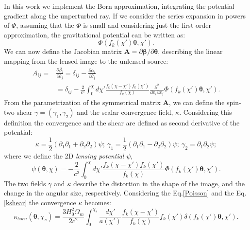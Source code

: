 \documentclass[twocolumn,twocolappendix]{aastex63}
\begin{document}
In this work we implement the Born approximation, integrating the potential gradient along the unperturbed ray. If we consider the series expansion in powers of $\Phi$, assuming that the $\Phi$ is small and considering just the first-order approximation, the gravitational potential  can be written as:
\begin{equation}
    \Phi(f_k(\chi')\boldsymbol{\theta},\chi').
\end{equation}
We can now define the Jacobian matrix \textbf{A}$=\partial\boldsymbol{\beta}/\partial\boldsymbol{\theta}$, describing the linear mapping from the lensed image to the unlensed source:
\begin{align}
    A_{ij}=& \frac{\partial\beta_i}{\partial\theta_j}=
    \delta_{ij}-\frac{\partial\alpha_i}{\partial\theta_j} \\
     & =\delta_{ij}-\frac{2}{c^2}
    \int_0^{\chi} d\chi'
     \frac{f_k(\chi-\chi')f_k(\chi')}{f_k(\chi)}
     \frac{\partial^2}{\partial x_i \partial x_j} \Phi(f_k(\chi')\boldsymbol{\theta},\chi').
\end{align}
From the parametrization of the symmetrical matrix \textbf{A}, we can define the spin-two shear $\gamma=(\gamma_1,\gamma_2)$ and the scalar convergence field, $\kappa$. 
Considering this definition the convergence and the shear are defined as second derivative of the potential:
\begin{equation}\label{kshear}
    \kappa=\frac{1}{2}(\partial_1\partial_1+\partial_2\partial_2)\psi; \ \gamma_1=\frac{1}{2}(\partial_1\partial_1-\partial_2\partial_2)\psi; \ 
    \gamma_2=\partial_1\partial_2\psi;
\end{equation}
where we define the 2D \textit{lensing potential} $\psi$,
\begin{equation}
    \psi(\boldsymbol{\theta},\chi)=
    -\frac{2}{c^2}
    \int_0^{\chi} d\chi'
     \frac{f_k(\chi-\chi')f_k(\chi')}{f_k(\chi)}
    \Phi(f_k(\chi')\boldsymbol{\theta},\chi').
\end{equation}
The two fields $\gamma$ and $\kappa$ describe the distortion in the shape of the image, and the change in the angular size, respectively.
Considering the Eq.\ref{Poisson} and the Eq.\ref{kshear} the convergence $\kappa$ becomes:
\begin{equation}
    \kappa_{born}(\boldsymbol{\theta},\chi_s)= \frac{3H_0^2 \Omega_m}{2c^2}
    \int_0^{\chi_s} 
    \frac{d\chi'}{a(\chi')}
     \frac{f_k(\chi-\chi')}{f_k(\chi)}
     f_k(\chi')
    \delta(f_k(\chi')\boldsymbol{\theta},\chi').
\end{equation}
\end{document}
